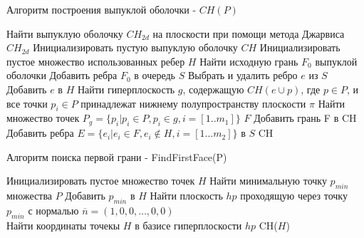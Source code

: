 \documentclass[a4paper,14pt]{extarticle}  %
\begin{document}
\begin{algorithm*}[H]
    \caption{Алгоритм построения выпуклой оболочки - $CH(P)$}
    \label{alg:gift}
    \DontPrintSemicolon
    {
        Найти выпуклую оболочку $CH_{2d}$ на плоскости при помощи метода Джарвиса\;
        \Return $CH_{2d}$\;
    }
    Инициализировать пустую выпуклую оболочку $CH$\;
    Инициализировать пустое множество использованных ребер $H$ \label{gift:initH}\;
    Найти исходную грань $F_0$ выпуклой оболочки\label{gift:firstFace}\;
    Добавить ребра $F_0$ в очередь $S$\;
    {
        Выбрать и удалить ребро $e$ из $S$\;
        Добавить $e$ в $H$\;
        Найти гиперплоскость $g$, содержащую
        $CH ( e \cup p )$, где $ p \in P$, и все точки  $p_i \in P$ принадлежат нижнему полупространству плоскости $\pi$\;
        Найти множество точек $P_g = \{p_i|p_i\in P, p_i \in g, i=\left[1.. m_1\right]\}$ \label{gift:findFace}\;
        {
            \Return $F$\;
        }
        Добавить грань F в CH\;
        Добавить ребра $E=\{e_i |e_i \in F, e_i \notin H, i = \left[ 1\ldots m_2\right]\}$ в $S$\; \label{gift:addedges}
    }
    \Return CH
\end{algorithm*}

\begin{algorithm*}[H]
    \caption{Алгоритм поиска первой грани - FindFirstFace(P)}
    \label{alg:firstFace}
    \DontPrintSemicolon
    Инициализировать пустое множество точек $H$\;
    Найти минимальную точку $p_{min}$ множества $P$\;
    Добавить $p_{min}$ в $H$\;
    Найти плоскость $hp$ проходящую через точку $p_{min}$ с нормалью $\overline{n} = (1,0,0,\ldots,0,0)$\\
    Найти координаты точекы $H$ в базисе гиперплоскости $hp$ \label{firstPlane :crdbasis}\;
\Return CH($H$)
\end{algorithm*}
\newpage
\end{document}
